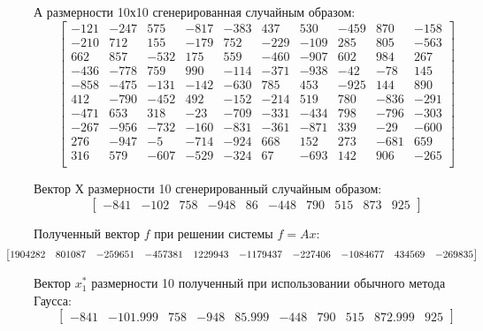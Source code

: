 \documentclass[12pt]{report}
\begin{document}
 А размерности 10х10 сгенерированная случайным образом:
\[
\begin{bmatrix}
      -121 &      -247 &       575 &      -817 &      -383 &       437 &       530 &      -459 &       870 &      -158 \\
      -210 &       712 &       155 &      -179 &       752 &      -229 &      -109 &       285 &       805 &      -563 \\
       662 &       857 &      -532 &       175 &       559 &      -460 &      -907 &       602 &       984 &       267 \\
      -436 &      -778 &       759 &       990 &      -114 &      -371 &      -938 &       -42 &       -78 &       145 \\
      -858 &      -475 &      -131 &      -142 &      -630 &       785 &       453 &      -925 &       144 &       890 \\
       412 &      -790 &      -452 &       492 &      -152 &      -214 &       519 &       780 &      -836 &      -291 \\
      -471 &       653 &       318 &       -23 &      -709 &      -331 &      -434 &       798 &      -796 &      -303 \\
      -267 &      -956 &      -732 &      -160 &      -831 &      -361 &      -871 &       339 &       -29 &      -600 \\
       276 &      -947 &        -5 &      -714 &      -924 &       668 &       152 &       273 &      -681 &       659 \\
       316 &       579 &      -607 &      -529 &      -324 &        67 &      -693 &       142 &       906 &      -265 \\
\end{bmatrix}
\]

Вектор $Х$ размерности 10 сгенерированный случайным образом:
\[
\begin{bmatrix}
   -841 & -102 & 758 & -948 & 86 & -448 & 790 & 515 & 873 & 925   
\end{bmatrix}
\]

Полученный вектор $f$ при решении системы $f = Ax$:
\[
\hspace{-1cm}
\begin{bmatrix}
   1904282 & 801087 & -259651 & -457381 & 1229943 & -1179437 & -227406 & -1084677 & 434569 & -269835
\end{bmatrix}
\]

Вектор $x_{1}^*$ размерности 10 полученный при использовании обычного метода Гаусса:
\[
\begin{bmatrix}
   -841 & -101.999 & 758 & -948 & 85.999 & -448 & 790 & 515 & 872.999 & 925
\end{bmatrix}
\]
\end{document}
